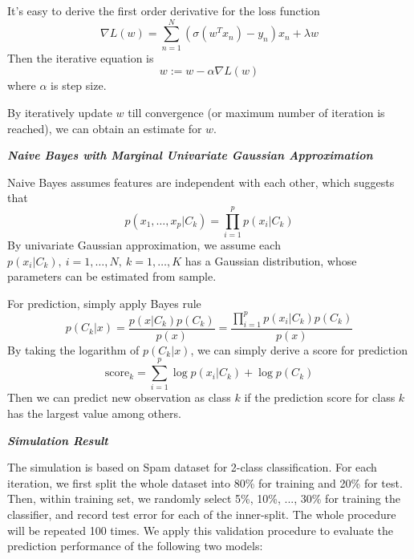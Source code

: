 \documentclass[12pt,oneside,a4paper]{article}
\begin{document}
It's easy to derive the first order derivative for the loss function
\begin{equation*}
    \nabla L(w) = \sum_{n = 1}^{N}(\sigma(w^{T}x_{n}) - y_{n})x_{n} + \lambda w
\end{equation*}
Then the iterative equation is
\begin{equation*}
    w := w - \alpha \nabla L(w)
\end{equation*}
where $\alpha$ is step size.

By iteratively update $w$ till convergence (or maximum number of iteration is reached), we can obtain an estimate for $w$.

\vspace{1em}
\textbf{\em Naive Bayes with Marginal Univariate Gaussian Approximation}

Naive Bayes assumes features are independent with each other, which suggests that
\begin{equation*}
    p(x_{1}, \dots, x_{p}|C_{k}) = \prod_{i = 1}^{p}{p(x_{i}|C_{k})}
\end{equation*}
By univariate Gaussian approximation, we assume each $p(x_{i}|C_{k}), ~i = 1,\dots,N , ~k = 1,\dots,K$ has a Gaussian distribution, whose parameters can be estimated from sample.

For prediction, simply apply Bayes rule
\begin{equation*}
    p(C_{k}|x) = \frac{p(x|C_{k})p(C_{k})}{p(x)} = \frac{\prod_{i = 1}^{p}{p(x_{i}|C_{k})}p(C_{k})}{p(x)}
\end{equation*}
By taking the logarithm of $p(C_{k}|x)$, we can simply derive a score for prediction
\begin{equation*}
    \mathrm{score}_{k} = \sum_{i = 1}^{p}{\log p(x_{i}|C_{k})} + \log p(C_{k})
\end{equation*}
Then we can predict new observation as class $k$ if the prediction score for class $k$ has the largest value among others.

\textbf{\em Simulation Result}

The simulation is based on Spam dataset for 2-class classification. For each iteration, we first split the whole dataset into 80\% for training and 20\% for test. Then, within training set, we randomly select 5\%, 10\%, ..., 30\% for training the classifier, and record test error for each of the inner-split. The whole procedure will be repeated 100 times. We apply this validation procedure to evaluate the prediction performance of the following two models:
\end{document}
